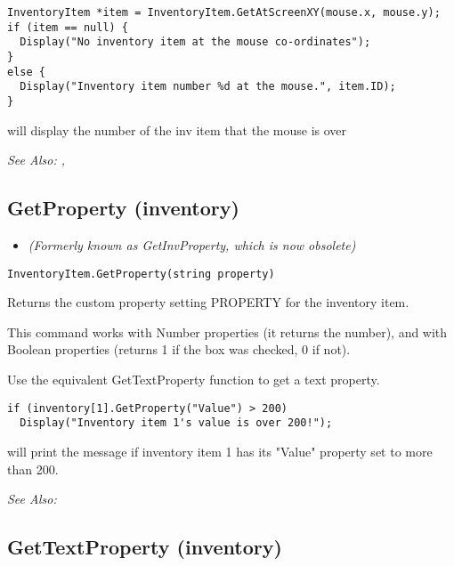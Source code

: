 \begin{verbatim}
InventoryItem *item = InventoryItem.GetAtScreenXY(mouse.x, mouse.y);
if (item == null) {
  Display("No inventory item at the mouse co-ordinates");
}
else {
  Display("Inventory item number %d at the mouse.", item.ID);
}
\end{verbatim}
will display the number of the inv item that the mouse is over

\it{See Also:} ,


\subsection{GetProperty (inventory)}\label{InventoryItem.GetProperty}%

\begin{itemize}
\item \it{(Formerly known as GetInvProperty, which is now obsolete)}
\end{itemize}

\begin{verbatim}
InventoryItem.GetProperty(string property)
\end{verbatim}
Returns the custom property setting PROPERTY for the inventory item.

This command works with Number properties (it returns the number), and with Boolean
properties (returns 1 if the box was checked, 0 if not).

Use the equivalent GetTextProperty function to get a text property.

\begin{verbatim}
if (inventory[1].GetProperty("Value") > 200)
  Display("Inventory item 1's value is over 200!");
\end{verbatim}
will print the message if inventory item 1 has its "Value" property set to more than 200.

\it{See Also:} 


\subsection{GetTextProperty (inventory)}\label{InventoryItem.GetTextProperty}%

